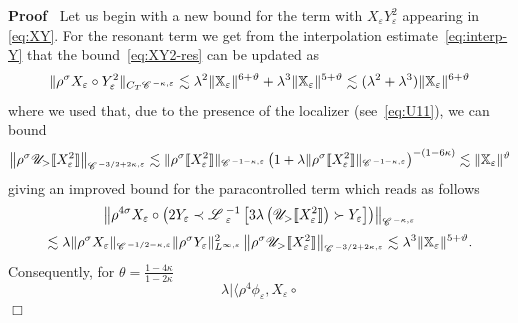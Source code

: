 \documentclass[a4paper,11pt]{article}
\newenvironment{proof}{\noindent\textbf{Proof\ }}{\hspace*{\fill}$\Box$\medskip}
\numberwithin{equation}{section}
\newcommand{\LL}{\mathscr{L} \hspace{.2em}}
\newcommand{\UU}{\mathscr{U}}
\begin{document}
\begin{proof}
  Let us begin with a new bound for the term with $X_{\varepsilon}
  Y_{\varepsilon}^2$ appearing in {\eqref{eq:XY}}. For the resonant term we
  get from the interpolation estimate~{\eqref{eq:interp-Y}} that the
  bound~{\eqref{eq:XY2-res}} can be updated as
  \[ \| \rho^{\sigma} X_{\varepsilon} \circ Y_{\varepsilon}^2 \|_{C_T
     \mathscr{C} \hspace{.1em}^{- \kappa, \varepsilon}} \lesssim \lambda^2 \|
     \mathbb{X}_{\varepsilon} \|^{6 + \vartheta} + \lambda^3 \|
     \mathbb{X}_{\varepsilon} \|^{5 + \vartheta} \lesssim (\lambda^2 +
     \lambda^3) \| \mathbb{X}_{\varepsilon} \|^{6 + \vartheta} \]
  where we used that, due to the presence of the localizer (see~{\eqref{eq:U11}}), we can bound
  \begin{equation}
    \left\| \rho^{\sigma} \UU_{>} \llbracket X_{\varepsilon}^2 \rrbracket
    \right\|_{\mathscr{C} \hspace{.1em}^{- 3 / 2 + 2 \kappa, \varepsilon}}
    \lesssim \| \rho^{\sigma} \llbracket X_{\varepsilon}^2 \rrbracket
    \|_{\mathscr{C} \hspace{.1em}^{- 1 - \kappa, \varepsilon}} \left( 1 +
    \lambda \| \rho^{\sigma} \llbracket X_{\varepsilon}^2 \rrbracket
    \|_{\mathscr{C} \hspace{.1em}^{- 1 - \kappa, \varepsilon}} \right)^{- (1 -
    6 \kappa)} \lesssim \| \mathbb{X}_{\varepsilon} \|^{\vartheta}
    \label{eq:impro-X2}
  \end{equation}
  giving an improved bound for the paracontrolled term which reads as follows
  \[ \left\| \rho^{4 \sigma} X_{\varepsilon} \circ \left( 2 Y_{\varepsilon}
     \prec \LL_{\varepsilon}^{- 1} \left[ 3 \lambda \left( \UU_{>} \llbracket
     X_{\varepsilon}^2 \rrbracket \right) \succ Y_{\varepsilon} \right]
     \right) \right\|_{\mathscr{C} \hspace{.1em}^{- \kappa, \varepsilon}} \]
  \[ \lesssim \lambda \| \rho^{\sigma} X_{\varepsilon} \|_{\mathscr{C}
     \hspace{.1em}^{- 1 / 2 - \kappa, \varepsilon}} \| \rho^{\sigma}
     Y_{\varepsilon} \|_{L^{\infty, \varepsilon}}^2 \left\| \rho^{\sigma}
     \UU_{>} \llbracket X_{\varepsilon}^2 \rrbracket \right\|_{\mathscr{C}
     \hspace{.1em}^{- 3 / 2 + 2 \kappa, \varepsilon}} \lesssim \lambda^3 \|
     \mathbb{X}_{\varepsilon} \|^{5 + \vartheta} . \]
  Consequently, for $\theta = \frac{1 - 4 \kappa}{1 - 2 \kappa}$
  \[ \lambda | \langle \rho^4 \phi_{\varepsilon}, X_{\varepsilon} \circ
\]
\end{proof}
\end{document}
